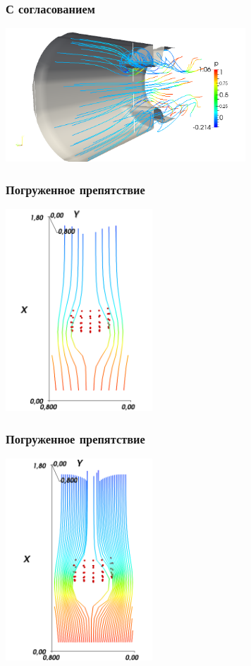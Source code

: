 \documentclass[14pt, notes]{beamer}
\begin{document}
\begin{frame}
\frametitle{С согласованием}
    \begin{center}
    \includegraphics[width=9cm]{images/valves_simple_angle.png}
    \end{center}
\end{frame}

\begin{frame}
\frametitle{Погруженное препятствие}
    \begin{center}
    \includegraphics[width=5.5cm]{images/ibm_results/ibm_slice_crop.png}
    \end{center}
\end{frame}

\begin{frame}
\frametitle{Погруженное препятствие}
    \begin{center}
    \includegraphics[width=5.5cm]{images/ibm_results/ibm_slice_more_lines_crop.png}
    \end{center}
\end{frame}
\end{document}
